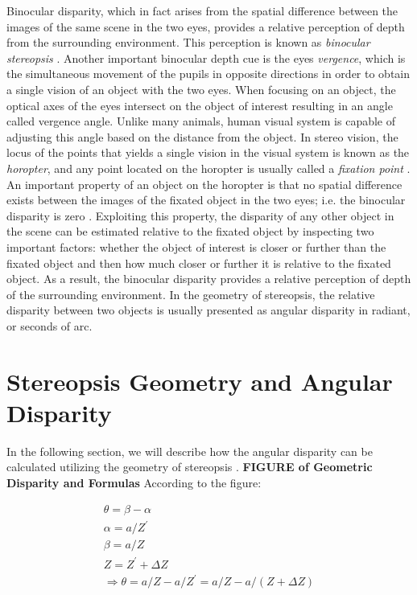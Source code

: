 \documentclass[12pt]{report}
\begin{document}
Binocular disparity, which in fact arises from the spatial difference 
between the images of the same scene in the two eyes, provides a relative perception of depth from the surrounding environment. This perception is known as {\it binocular stereopsis} \cite{how95}. 
Another important binocular depth cue is the eyes {\it vergence}, which is the simultaneous movement of the pupils in opposite directions in order to obtain a single vision of an object with the
two eyes. When focusing on an object, the optical axes of the eyes intersect on the object of interest resulting in an angle called vergence angle. Unlike many animals, human visual system 
is capable of adjusting this angle based on the distance from the object.
In stereo vision, the locus of the points that yields a single vision in the visual system is known as the {\it horopter}, and any point located on the horopter is usually called a 
{\it fixation point} \cite{binr83,how95}.
An important property of an object on the horopter is that no spatial difference
exists between the images of the fixated object in the two eyes; i.e. the binocular disparity is zero \cite{how95}. 
Exploiting this property, the disparity of any other object in the scene can be estimated relative to the fixated object by inspecting two important factors: 
whether the object of interest is closer or further than the fixated object and then how much closer or further it is relative to the fixated object.
As a result, the binocular disparity provides a relative perception of depth of the surrounding environment.
In the geometry of stereopsis, the relative disparity between two objects is usually presented as angular disparity in radiant, or seconds of arc.

\section{Stereopsis Geometry and Angular Disparity}

In the following section, we will describe how the angular disparity can be calculated utilizing the geometry of stereopsis \cite{binr83}.
\textbf{FIGURE of Geometric Disparity and Formulas}
According to the figure:

\begin{align}
\theta = \beta - \alpha \\
\alpha = a/Z^{'} \\
\beta = a/Z \\
Z = Z^{'} + \Delta Z \\
\Rightarrow \theta = a/Z - a/Z^{'} = a/Z - a/(Z+\Delta Z)
\end{align}
\end{document}
